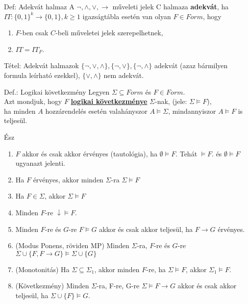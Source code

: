 \documentclass{beamer}
\begin{document}
\begin{frame}

\begin{block}{Def: Adekvát halmaz}
A ${\neg}, {\land}, {\lor}, \rightarrow$ műveleti jelek C halmaza \textbf{adekvát}, ha\\
$IT: \{0, 1\}^k \rightarrow \{0, 1\}, k \geq 1$ igazságtábla esetén van olyan $F \in Form$, hogy\\
\begin{enumerate}
\item $F$-ben csak $C$-beli műveletei jelek szerepelhetnek,
\item $IT = IT_F$.
\end{enumerate} 
\end{block}
\bigskip

\begin{block}{Tétel: Adekvát halmazok}
$\{\neg, \lor, \land\}, \{\neg, \lor\}, \{\neg, \land\}$ adekvát (azaz bármilyen formula leírható ezekkel), $\{\lor, \land\}$ nem adekvát.
\end{block}

\end{frame}

\begin{frame}
\begin{block}{Def.: Logikai következmény}
Legyen $\Sigma \subseteq Form$ és $F \in Form$.\\
Azt mondjuk, hogy $F$ \underline{\textbf{logikai következménye}} $\Sigma$-nak, (jele: $\Sigma \models F$),\\
ha minden $A$ hozzárendelés esetén valahányszor $A \models \Sigma$, mindannyiszor $A \models F$ is teljesül.
\end{block}
\bigskip
\begin{block}{Ész}
\begin{enumerate}
\item $F$ akkor és csak akkor érvényes (tautológia), ha $\emptyset \models F$. Tehát $\models F$. és $\emptyset \models F$ ugyanazt jelenti.
\item Ha $F$ érvényes, akkor minden $\Sigma$-ra $\Sigma \models F$
\item Ha $F \in \Sigma$, akkor $\Sigma \models F$
\item Minden $F$-re $\downarrow \models F$.
\item Minden $F$-re és $G$-re $F \models G$ akkor és csak akkor teljesül, ha $F \rightarrow G$ érvényes.
\item (Modus Ponens, röviden MP) Minden $\Sigma$-ra, $F$-re és $G$-re $\Sigma \cup \{F, F \rightarrow G\} \models \Sigma \cup \{G\}$
\item (Monotonitás) Ha $\Sigma \subseteq {\Sigma}_1$, akkor minden $F$-re, ha $\Sigma \models F$, akkor ${\Sigma}_1 \models F$.
\item (Következmény) Minden $\Sigma$-ra, F-re, G-re $\Sigma \models F \rightarrow G$ akkor és csak akkor teljesül, ha $\Sigma \cup \{F\} \models G$.
\end{enumerate}
\end{block}

\end{frame}
\end{document}
